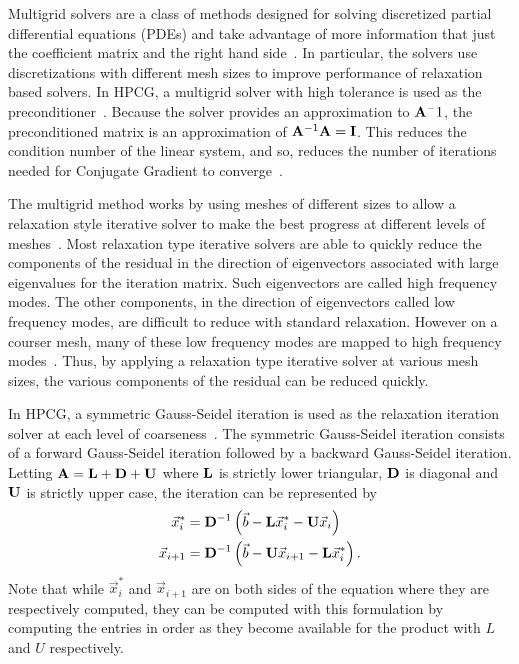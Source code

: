 Multigrid solvers are a class of methods designed for solving discretized partial differential equations (PDEs) and take advantage of more information that just the coefficient matrix and the right hand side~\cite{Saad:2003:IterativeMethods}.
In particular, the solvers use discretizations with different mesh sizes to improve performance of relaxation based solvers.
In HPCG, a multigrid solver with high tolerance is used as the preconditioner~\cite{Dongarra:2015:HPCG}.
Because the solver provides an approximation to \(\mathbf{A}^-1\), the preconditioned matrix is an approximation of \(\mathbf{A}^{-1}\mathbf{A} = \mathbf{I}\).
This reduces the condition number of the linear system, and so, reduces the number of iterations needed for Conjugate Gradient to converge~\cite{Saad:2003:IterativeMethods}.

The multigrid method works by using meshes of different sizes to allow a relaxation style iterative solver to make the best progress at different levels of meshes~\cite{Saad:2003:IterativeMethods}.
Most relaxation type iterative solvers are able to quickly reduce the components of the residual in the direction of eigenvectors associated with large eigenvalues for the iteration matrix.
Such eigenvectors are called high frequency modes.
The other components, in the direction of eigenvectors called low frequency modes, are difficult to reduce with standard relaxation.
However on a courser mesh, many of these low frequency modes are mapped to high frequency modes~\cite{Saad:2003:IterativeMethods}.
Thus, by applying a relaxation type iterative solver at various mesh sizes, the various components of the residual can be reduced quickly.

In HPCG, a symmetric Gauss-Seidel iteration is used as the relaxation iteration solver at each level of coarseness~\cite{Dongarra:2015:HPCG}.
The symmetric Gauss-Seidel iteration consists of a forward Gauss-Seidel iteration followed by a backward Gauss-Seidel iteration.
Letting \(\mathbf{A} = \mathbf{L}+\mathbf{D}+\mathbf{U}\) where \(\mathbf{L}\) is strictly lower triangular, \(\mathbf{D}\) is diagonal and \(\mathbf{U}\) is strictly upper case, the iteration can be represented by
\begin{align*}
	\vec{x}^*_i   &= \mathbf{D}^{-1}\left(\vec{b} - \mathbf{L}\vec{x}^*_i - \mathbf{U}\vec{x}_i\right) \\
	\vec{x}_{i+1} &= \mathbf{D}^{-1}\left(\vec{b} - \mathbf{U}\vec{x}_{i+1} - \mathbf{L}\vec{x}^*_i\right).
\end{align*}
Note that while \(\vec{x}^*_i\) and \(\vec{x}_{i+1}\) are on both sides of the equation where they are respectively computed, they can be computed with this formulation by computing the entries in order as they become available for the product with \(L\) and \(U\) respectively.
